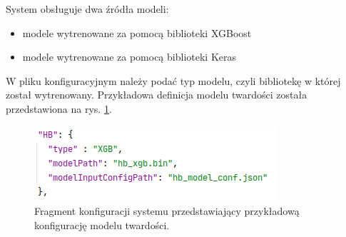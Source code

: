 System obsługuje dwa źródła modeli:
\begin{itemize}
    \item modele wytrenowane za pomocą biblioteki XGBoost
    \item modele wytrenowane za pomocą biblioteki Keras
\end{itemize}

W pliku konfiguracyjnym należy podać typ modelu, czyli bibliotekę w której został wytrenowany. Przykładowa definicja modelu twardości została przedstawiona na rys. \ref{fig:hb-xgb}.

\begin{figure}[ht]{}
	\centering
	\includegraphics[scale=0.8]{images/hb-xgb.png}
	\caption {
		 Fragment konfiguracji systemu przedstawiający przykładową konfigurację modelu twardości.
	}
	\label{fig:hb-xgb}
\end{figure}






